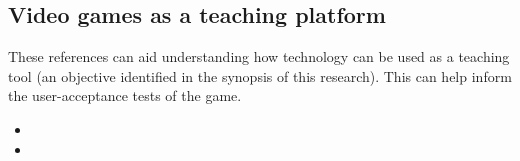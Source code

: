 \documentclass[a4paper]{article}
\begin{document}
\subsection{Video games as a teaching platform}
\vspace{-5mm}
\par \noindent These references can aid understanding how technology can be used as a teaching tool (an objective identified in the synopsis of this research). This can help inform the user-acceptance tests of the game.
\begin{itemize}
  \item {} \vspace{-2.5mm}
  \item {}
\end{itemize}



\end{document}
